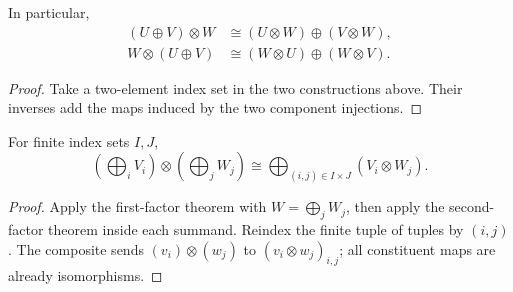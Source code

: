 \begin{corollary}\label{thm:tensor-distributivity}
In particular,
\begin{align*}
(U\oplus V)\otimes W&\cong(U\otimes W)\oplus(V\otimes W),\\
W\otimes(U\oplus V)&\cong(W\otimes U)\oplus(W\otimes V).
\end{align*}
\end{corollary}
\begin{proof}
Take a two-element index set in the two constructions above.
Their inverses add the maps induced by the two component injections.
\end{proof}
\begin{corollary}\label{cor:finite-tensor-distributivity}
For finite index sets $I,J$,
\[
(\bigoplus_iV_i)\otimes(\bigoplus_jW_j)
\cong\bigoplus_{(i,j)\in I\times J}(V_i\otimes W_j).
\]
\end{corollary}
\begin{proof}
Apply the first-factor theorem with $W=\bigoplus_jW_j$, then apply
the second-factor theorem inside each summand. Reindex the finite tuple
of tuples by $(i,j)$. The composite sends $(v_i)\otimes(w_j)$ to
$(v_i\otimes w_j)_{i,j}$; all constituent maps are already isomorphisms.
\end{proof}
